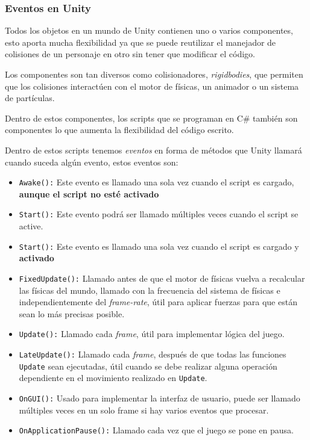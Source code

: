 \documentclass{pre-tfg}
\begin{document}
\subsubsection{Eventos en Unity}

Todos los objetos en un mundo de Unity contienen uno o varios componentes, esto aporta mucha flexibilidad ya que se puede reutilizar el manejador de colisiones de un personaje en otro sin tener que modificar el código.

Los componentes son tan diversos como colisionadores, \emph{rigidbodies}, que permiten que los colisiones interactúen con el motor de físicas, un animador o un sistema de partículas.

Dentro de estos componentes, los scripts que se programan en C\# también son componentes lo que aumenta la flexibilidad del código escrito.

Dentro de estos scripts tenemos \emph{eventos} en forma de métodos que Unity llamará cuando suceda algún evento, estos eventos son:

\begin{itemize}
	\item \texttt{Awake():} Este evento es llamado una sola vez cuando el script es cargado, \textbf{aunque el script no esté activado}
	\item \texttt{Start():} Este evento podrá ser llamado múltiples veces cuando el script se active.
	\item \texttt{Start():} Este evento es llamado una sola vez cuando el script es cargado y \textbf{activado}
	\item \texttt{FixedUpdate():} Llamado antes de que el motor de físicas vuelva a recalcular las físicas del mundo, llamado con la frecuencia del sistema de físicas e independientemente del \emph{frame-rate}, útil para aplicar fuerzas para que están sean lo más precisas posible.
	\item \texttt{Update():} Llamado cada \emph{frame}, útil para implementar lógica del juego.
	\item \texttt{LateUpdate():} Llamado cada \emph{frame}, después de que todas las funciones \texttt{Update} sean ejecutadas, útil cuando se debe realizar alguna operación dependiente en el movimiento realizado en \texttt{Update}.
	\item \texttt{OnGUI():} Usado para implementar la interfaz de usuario, puede ser llamado múltiples veces en un solo frame si hay varios eventos que procesar.
	\item \texttt{OnApplicationPause():} Llamado cada vez que el juego se pone en pausa.
\end{itemize}
\end{document}
